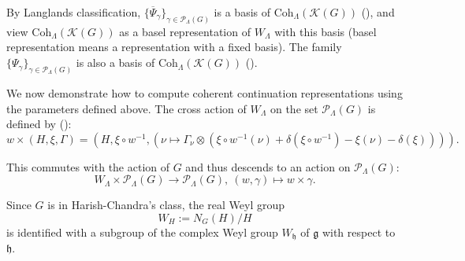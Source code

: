 \documentclass[12pt, a4paper]{amsart}
\numberwithin{equation}{section}
\newcommand{\CK}{{\mathcal {K}}}
\newcommand{\CP}{{\mathcal {P}}}
\newcommand{\fg}{\mathfrak{g}}
\newcommand{\fh}{\mathfrak{h}}
\renewcommand{\bar}{\overline}
\begin{document}
By Langlands classification, $\{ \bar{\Psi}_{\gamma} \}_{\gamma \in \CP_{\Lambda}(G)}$ is a basis of $\mathrm{Coh}_{\Lambda}(\CK(G))$ (\cite[Proposition 6.6.7]{Vog81}), and view $\mathrm{Coh}_{\Lambda}(\CK(G))$ as a basel representation of $W_{\Lambda}$ with this basis  (basel representation means a representation with a fixed basis). The family $\{ \Psi_{\gamma} \}_{\gamma \in \CP_{\Lambda}(G)}$ is also a basis of $\mathrm{Coh}_{\Lambda}(\CK(G))$ (\cite[Theorem 6.5.12]{Vog81}).

We now demonstrate how to compute coherent continuation representations using the parameters defined above.
The cross action of $W_{\Lambda}$ on the set $\mathscr{P}_{\Lambda}(G)$ is defined by (\cite[Definition 4.2]{Vog82}):
\begin{equation}
    w \times (H, \xi, \Gamma) = (H, \xi \circ w^{-1}, (\nu \mapsto \Gamma_{\nu} \otimes (\xi \circ w^{-1}(\nu) + \delta(\xi \circ w^{-1}) - \xi (\nu) - \delta(\xi)))).
\end{equation}

This commutes with the action of $G$ and thus descends to an action on $\CP_{\Lambda}(G)$:
\begin{equation}
    W_{\Lambda} \times \CP_{\Lambda}(G) \to \CP_{\Lambda}(G), \ (w,\gamma) \mapsto w \times \gamma.
\end{equation}

Since $G$ is in Harish-Chandra's class, the real Weyl group
\begin{equation}
    W_{H} := N_{G}(H)/H
\end{equation}
is identified with a subgroup of the complex Weyl group $W_{\fh}$ of $\fg$ with respect to $\fh$.
\end{document}
